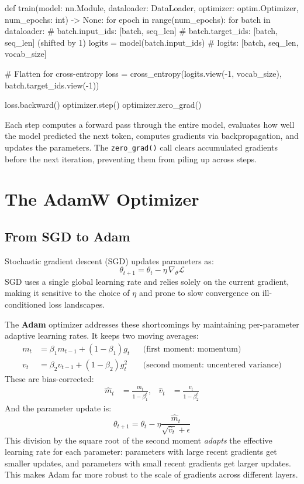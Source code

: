 \begin{pseudocode}
def train(model: nn.Module, dataloader: DataLoader,
          optimizer: optim.Optimizer, num_epochs: int) -> None:
    for epoch in range(num_epochs):
        for batch in dataloader:
            # batch.input_ids: [batch, seq_len]
            # batch.target_ids: [batch, seq_len] (shifted by 1)
            logits = model(batch.input_ids)
            # logits: [batch, seq_len, vocab_size]

            # Flatten for cross-entropy
            loss = cross_entropy(logits.view(-1, vocab_size),
                                 batch.target_ids.view(-1))

            loss.backward()
            optimizer.step()
            optimizer.zero_grad()
\end{pseudocode}

Each step computes a forward pass through the entire model, evaluates how well the model predicted the next token, computes gradients via backpropagation, and updates the parameters. The \texttt{zero\_grad()} call clears accumulated gradients before the next iteration, preventing them from piling up across steps.

\section{The AdamW Optimizer}

\subsection{From SGD to Adam}

Stochastic gradient descent (SGD) updates parameters as:
\[
  \theta_{t+1} = \theta_t - \eta \, \nabla_\theta \mathcal{L}
\]
SGD uses a single global learning rate and relies solely on the current gradient, making it sensitive to the choice of $\eta$ and prone to slow convergence on ill-conditioned loss landscapes.

The \textbf{Adam} optimizer addresses these shortcomings by maintaining per-parameter adaptive learning rates. It keeps two moving averages:
\begin{align*}
  m_t &= \beta_1 m_{t-1} + (1 - \beta_1) g_t & &\text{(first moment: momentum)} \\
  v_t &= \beta_2 v_{t-1} + (1 - \beta_2) g_t^2 & &\text{(second moment: uncentered variance)}
\end{align*}
These are bias-corrected:
\begin{align*}
  \hat{m}_t &= \frac{m_t}{1 - \beta_1^t}, &
  \hat{v}_t &= \frac{v_t}{1 - \beta_2^t}
\end{align*}
And the parameter update is:
\[
  \theta_{t+1} = \theta_t - \eta \frac{\hat{m}_t}{\sqrt{\hat{v}_t} + \epsilon}
\]
This division by the square root of the second moment \emph{adapts} the effective learning rate for each parameter: parameters with large recent gradients get smaller updates, and parameters with small recent gradients get larger updates. This makes Adam far more robust to the scale of gradients across different layers.

